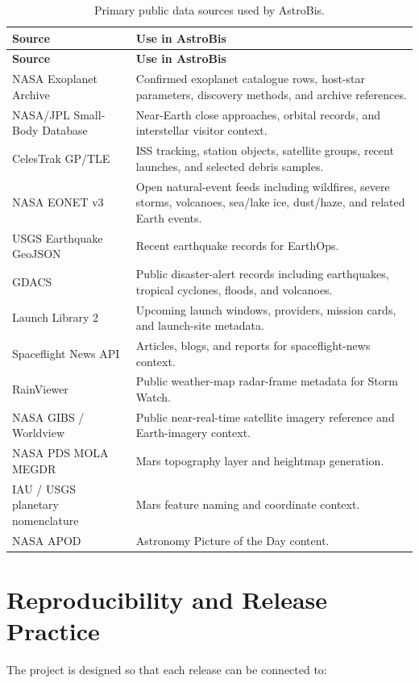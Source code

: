 \documentclass[11pt,a4paper]{article}
\begin{document}
\begin{longtable}{p{}p{}}
\caption{Primary public data sources used by AstroBis.}
\label{tab:sources}\\
\toprule
\textbf{Source} & \textbf{Use in AstroBis}\\
\midrule
\endfirsthead
\toprule
\textbf{Source} & \textbf{Use in AstroBis}\\
\midrule
\endhead
NASA Exoplanet Archive & Confirmed exoplanet catalogue rows, host-star parameters, discovery methods, and archive references.\\
NASA/JPL Small-Body Database & Near-Earth close approaches, orbital records, and interstellar visitor context.\\
CelesTrak GP/TLE & ISS tracking, station objects, satellite groups, recent launches, and selected debris samples.\\
NASA EONET v3 & Open natural-event feeds including wildfires, severe storms, volcanoes, sea/lake ice, dust/haze, and related Earth events.\\
USGS Earthquake GeoJSON & Recent earthquake records for EarthOps.\\
GDACS & Public disaster-alert records including earthquakes, tropical cyclones, floods, and volcanoes.\\
Launch Library 2 & Upcoming launch windows, providers, mission cards, and launch-site metadata.\\
Spaceflight News API & Articles, blogs, and reports for spaceflight-news context.\\
RainViewer & Public weather-map radar-frame metadata for Storm Watch.\\
NASA GIBS / Worldview & Public near-real-time satellite imagery reference and Earth-imagery context.\\
NASA PDS MOLA MEGDR & Mars topography layer and heightmap generation.\\
IAU / USGS planetary nomenclature & Mars feature naming and coordinate context.\\
NASA APOD & Astronomy Picture of the Day content.\\
\bottomrule
\end{longtable}

\section{Reproducibility and Release Practice}

The project is designed so that each release can be connected to:
\end{document}
